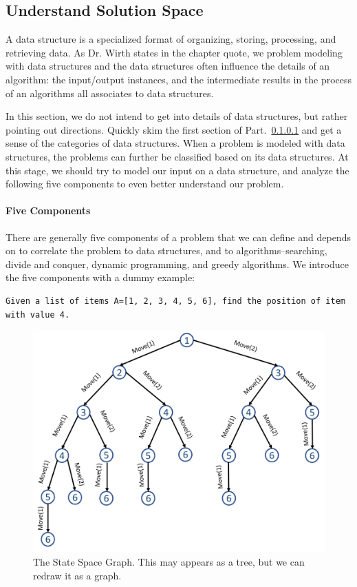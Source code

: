 \documentclass[../main.tex]{subfiles}
\begin{document}
\subsection{Understand Solution Space}
\label{sec_data_structures}
A data structure is a specialized format of organizing, storing, processing, and  retrieving data. As Dr. Wirth states in the chapter quote, we problem modeling with data structures and the data structures often influence the details of an algorithm: the input/output instances, and the intermediate results in the process of an algorithms all associates to data structures.

In this section, we do not intend to get into details of data structures, but rather pointing out directions. Quickly skim the first section of Part.~\ref{} and get a sense of the categories of data structures. When a problem is modeled with data structures, the problems can further be classified based on its data structures. At this stage, we should try to model our input on a data structure, and analyze the following five components to even better understand our problem.  


\paragraph{Five Components} There are generally five components of a problem that we can define and depends on to correlate the problem to data structures, and to algorithms--searching, divide and conquer, dynamic programming, and greedy algorithms. We introduce the five components with a dummy example:
\begin{lstlisting}[numbers=none]
Given a list of items A=[1, 2, 3, 4, 5, 6], find the position of item with value 4. 
\end{lstlisting}
\begin{figure}[!ht]
    \centering
     \includegraphics[width=0.7\columnwidth]{fig/problem_formulation_2.png}
    \caption{The State Space Graph. This may appears as a tree, but we can redraw it as a graph. }
    \label{fig:problem_formulation}
\end{figure}
 
\end{document}
